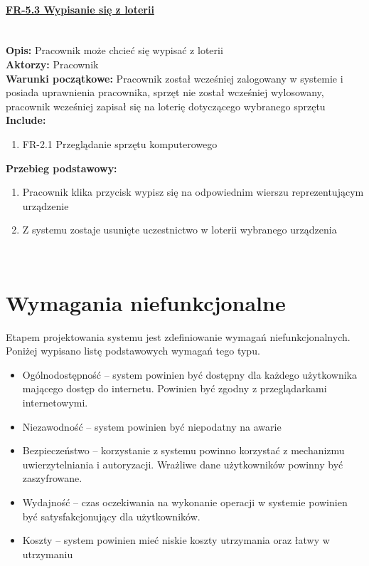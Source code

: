 \paragraph{\underline{FR-5.3 Wypisanie się z loterii}}\mbox{}\\[1mm]
	\noindent\textbf{Opis:} Pracownik może chcieć się wypisać z loterii\\
	\noindent\textbf{Aktorzy:} Pracownik\\
	\textbf{Warunki początkowe:} Pracownik został wcześniej zalogowany w systemie i posiada uprawnienia pracownika, sprzęt nie został wcześniej wylosowany, pracownik wcześniej zapisał się na loterię dotyczącego wybranego sprzętu\\
	\textbf{Include:} 
	\begin{enumerate}[noparskip]
		\item FR-2.1 Przeglądanie sprzętu komputerowego
	\end{enumerate}
  \textbf{Przebieg podstawowy:}
	\begin{enumerate}[noparskip]
		\item Pracownik klika przycisk wypisz się na odpowiednim wierszu reprezentującym urządzenie
		\item Z systemu zostaje usunięte uczestnictwo w loterii wybranego urządzenia
  \end{enumerate} \mbox{}\\[-11mm]

\section{Wymagania niefunkcjonalne}

Etapem projektowania systemu jest zdefiniowanie wymagań niefunkcjonalnych. Poniżej wypisano listę podstawowych wymagań tego typu.
\begin{itemize}
	\item Ogólnodostępność -- system powinien być dostępny dla każdego użytkownika mającego dostęp do internetu. Powinien być zgodny z przeglądarkami internetowymi.
	\item Niezawodność -- system powinien być niepodatny na awarie
	\item Bezpieczeństwo -- korzystanie z systemu powinno korzystać z mechanizmu uwierzytelniania i autoryzacji. Wrażliwe dane użytkowników powinny być zaszyfrowane.
	\item Wydajność -- czas oczekiwania na wykonanie operacji w systemie powinien być satysfakcjonujący dla użytkowników.
	\item Koszty -- system powinien mieć niskie koszty utrzymania oraz łatwy w utrzymaniu
\end{itemize}
 









